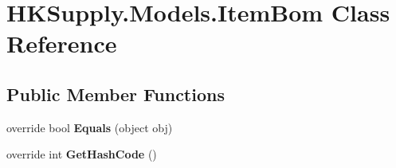 \hypertarget{class_h_k_supply_1_1_models_1_1_item_bom}{}\section{H\+K\+Supply.\+Models.\+Item\+Bom Class Reference}
\label{class_h_k_supply_1_1_models_1_1_item_bom}
\subsection*{Public Member Functions}
\begin{DoxyCompactItemize}
\item 
\mbox{\label{class_h_k_supply_1_1_models_1_1_item_bom_a411826952ab1e0c8953a0a2a01e73560}} 
override bool {\bfseries Equals} (object obj)
\item 
\mbox{\label{class_h_k_supply_1_1_models_1_1_item_bom_ab9a2ace4e0b73e64d4b47f454916aa74}} 
override int {\bfseries Get\+Hash\+Code} ()
\end{DoxyCompactItemize}
